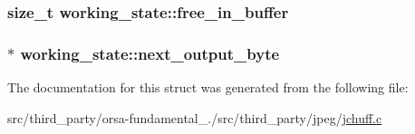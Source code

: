 \subsubsection[{free\+\_\+in\+\_\+buffer}]{\setlength{\rightskip}{0pt plus 5cm}size\+\_\+t working\+\_\+state\+::free\+\_\+in\+\_\+buffer}\label{structworking__state_a2a369c125a91f2aaebbb71ab52e37e7e}
\hypertarget{structworking__state_aa672d560261c7d8bb78f4014489f9661}{}
\subsubsection[{next\+\_\+output\+\_\+byte}]{$\ast$ working\+\_\+state\+::next\+\_\+output\+\_\+byte}\label{structworking__state_aa672d560261c7d8bb78f4014489f9661}


The documentation for this struct was generated from the following file\+:\begin{DoxyCompactItemize}
\item 
src/third\+\_\+party/orsa-\/fundamental\+\_./src/third\+\_\+party/jpeg/\hyperlink{jchuff_8c}{jchuff.\+c}\end{DoxyCompactItemize}
